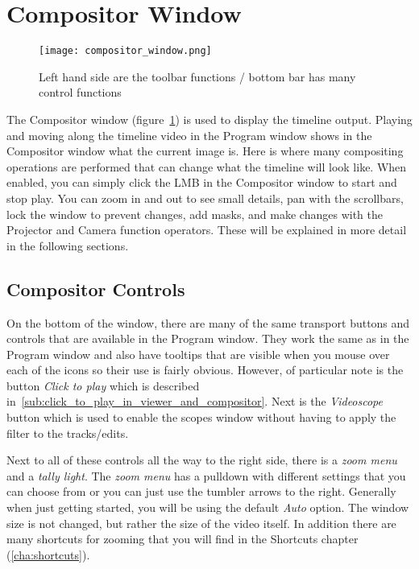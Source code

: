\section{Compositor Window}%
\label{sec:compositor_window}

\begin{figure}[htpb]
    \centering
    \texttt{[image: compositor\_window.png]}
    \caption{Left hand side are the toolbar functions / bottom bar has many control functions}
    \label{fig:compositor_window}
\end{figure}

The Compositor window (figure~\ref{fig:compositor_window}) is used to display the timeline
output.  Playing and moving along the timeline video in the Program window shows in the
Compositor window what the current image is.  Here is where many compositing operations are
performed that can change 
what the timeline will look like.  When enabled, you can simply click the LMB in the Compositor
window to start and stop play.
  You can zoom in and out to 
see small details, pan with the scrollbars, lock the window to prevent changes, add masks,
and make changes with the Projector and Camera function operators. These will be explained
in more detail in the following sections.

\subsection{Compositor Controls}%
\label{sub:compositor_controls}

On the bottom of the window, there are many
of the same transport buttons and controls that are available in the Program window.
They work the same as in the Program window and also have tooltips that are visible 
when you mouse over each of the icons so their use is fairly obvious.  However,
of particular note is the button \textit{Click to play} which is described in~\ref{sub:click_to_play_in_viewer_and_compositor}.  Next is the \textit{Videoscope} button which is used to enable the scopes window
without having to apply the filter to the tracks/edits.

Next to all of these controls all the way to the right side, there is a \textit{zoom menu} and a \textit{tally light}.  The \textit{zoom menu} has a pulldown with different settings that you can choose from
or you can just use the tumbler arrows to the right. Generally when just getting started, you
will be using the default \textit{Auto} option.  The window size is not changed, but rather
the size of the video itself. In addition there are many shortcuts for zooming that you
will find in the Shortcuts chapter (\ref{cha:shortcuts}).

